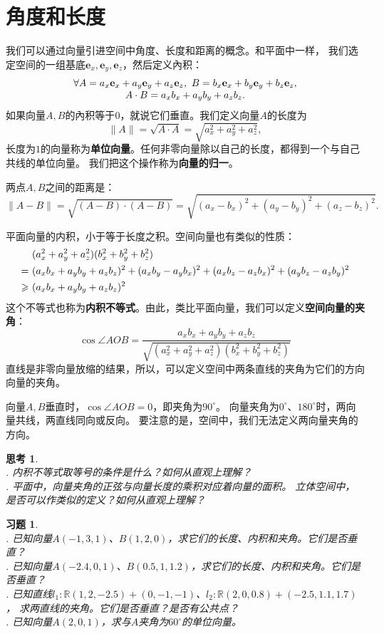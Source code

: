 \documentclass[12pt,UTF8]{ctexbook}
\newtheorem{sk}{思考}[section]
\newtheorem{xt}{习题}[section]
\begin{document}
\section{角度和长度}
我们可以通过向量引进空间中角度、长度和距离的概念。和平面中一样，
我们选定空间的一组基底$\mathbf{e}_x,\mathbf{e}_y,\mathbf{e}_z$，然后定义內积：
$$
\begin{array}{c}
    \forall  A = a_x\mathbf{e}_x+a_y\mathbf{e}_y+a_z\mathbf{e}_z,\,\,B = b_x\mathbf{e}_x+b_y\mathbf{e}_y+b_z\mathbf{e}_z, \notag \\
     A\cdot B = a_xb_x + a_yb_y + a_zb_z. \notag
\end{array}
$$ 
如果向量$A,B$的內积等于$0$，就说它们垂直。我们定义向量$A$的长度为
$$\|A\| = \sqrt{A\cdot A} = \sqrt{a_x^2 + a_y^2 + a_z^2},$$
长度为$1$的向量称为\textbf{单位向量}。任何非零向量除以自己的长度，都得到一个与自己共线的单位向量。
我们把这个操作称为\textbf{向量的归一}。

两点$A,B$之间的距离是：
$$\|A-B\| = \sqrt{(A - B)\cdot(A-B)} = \sqrt{(a_x - b_x)^2 + (a_y-b_y)^2 + (a_z-b_z)^2}. $$

平面向量的内积，小于等于长度之积。空间向量也有类似的性质：
\begin{align}
    &(a_x^2 + a_y^2 + a_z^2)(b_x^2 + b_y^2 + b_z^2) \notag \\
    =\,\,& (a_xb_x + a_yb_y + a_zb_z)^2 + (a_xb_y - a_yb_x)^2 + (a_xb_z - a_zb_x)^2 + (a_yb_z - a_zb_y)^2 \notag \\
    \geqslant\,\,& (a_xb_x + a_yb_y + a_zb_z)^2 \notag 
\end{align}
这个不等式也称为\textbf{内积不等式}。由此，类比平面向量，我们可以定义\textbf{空间向量的夹角}：
$$ \cos \angle AOB = \frac{a_xb_x + a_yb_y + a_zb_z}{\sqrt{(a_x^2 + a_y^2 + a_z^2)(b_x^2 + b_y^2 + b_z^2)}}$$
直线是非零向量放缩的结果，所以，可以定义空间中两条直线的夹角为它们的方向向量的夹角。

向量$A,B$垂直时，$\cos \angle AOB = 0$，即夹角为$90^\circ$。
向量夹角为$0^\circ$、$180^\circ$时，两向量共线，两直线同向或反向。
要注意的是，空间中，我们无法定义两向量夹角的方向。

\begin{sk}
    \mbox{} \\
    . 内积不等式取等号的条件是什么？如何从直观上理解？\\
    . 平面中，向量夹角的正弦与向量长度的乘积对应着向量的面积。
    立体空间中，是否可以作类似的定义？如何从直观上理解？
\end{sk}

\begin{xt}
    \mbox{} \\
    . 已知向量$A(-1, 3, 1)$、$B(1, 2, 0)$，求它们的长度、内积和夹角。它们是否垂直？\\
    . 已知向量$A(-2.4, 0, 1)$、$B(0.5, 1, 1.2)$，求它们的长度、内积和夹角。它们是否垂直？\\
    . 已知直线$l_1: \mathbb{R}(1,2,-2.5) + (0,-1,-1)$、$l_2: \mathbb{R}(2,0,0.8) + (-2.5,1.1,1.7)$，
    求两直线的夹角。它们是否垂直？是否有公共点？\\
    . 已知向量$A(2, 0, 1)$，求与$A$夹角为$60^\circ$的单位向量。
\end{xt}
\end{document}
